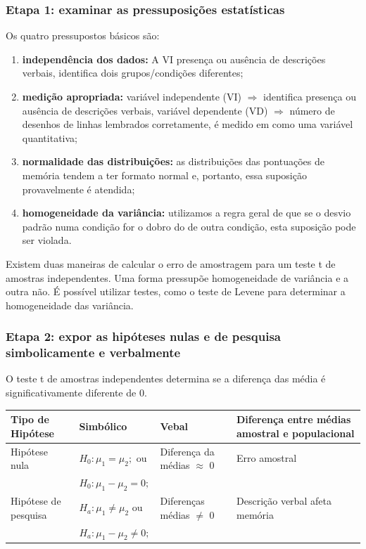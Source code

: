 \documentclass[11pt]{beamer}
\begin{document}
\begin{frame}
\frametitle{Etapa 1: examinar as pressuposições estatísticas}

Os quatro pressupostos básicos são:

\begin{enumerate}
\item \textbf{independência dos dados:} A VI presença ou ausência de descrições verbais, identifica dois grupos/condições diferentes;
\item \textbf{medição apropriada:} variável independente (VI) \(\Rightarrow\) identifica presença ou ausência de descrições verbais, variável dependente (VD) \(\Rightarrow\) número de desenhos de linhas lembrados corretamente, é medido em como uma variável quantitativa;
\item \textbf{normalidade das distribuições:} as distribuições das pontuações de memória tendem a ter formato normal e, portanto, essa suposição provavelmente é atendida;
\item \textbf{homogeneidade da variância:} utilizamos a regra geral de que se o desvio padrão numa condição for o dobro do de outra condição, esta suposição pode ser violada.
\end{enumerate}

Existem duas maneiras de calcular o erro de amostragem para um teste t de amostras independentes. Uma forma pressupõe homogeneidade de variância e a outra não. É possível utilizar testes, como o teste de Levene para determinar a homogeneidade das variância.

\end{frame}

\begin{frame}
\frametitle{Etapa 2: expor as hipóteses nulas e de pesquisa simbolicamente e verbalmente}

O teste t de amostras independentes determina se a diferença das média é significativamente diferente de 0.

\begin{center}
\begin{tabular}{ m{2cm}|m{3cm}|m{2cm}|m{3cm} } 
 \hline
 Tipo de Hipótese & Simbólico & Vebal & Diferença entre médias amostral e populacional\\
  \hline
 Hipótese nula & $H_0:\mu_1=\mu_2;$ ou & Diferença da médias $\approx$ 0 & Erro amostral \\
 & $H_0:\mu_1-\mu_2=0;$ & &\\
 Hipótese de pesquisa & $H_a:\mu_1 \neq \mu_2$ ou & Diferenças médias $\neq$ 0 & Descrição verbal afeta memória  \\ 
  & $H_a:\mu_1-\mu_2\neq0;$ & &\\
 \hline
 \hline
\end{tabular}
\end{center}

\end{frame}
\end{document}
